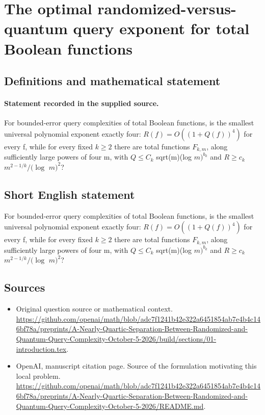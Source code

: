 \documentclass[11pt]{article}
\begin{document}
\section*{The optimal randomized-versus-quantum query exponent for total Boolean functions}\label{30007249}
\subsection{Definitions and mathematical statement}
\paragraph{Statement recorded in the supplied source.}
For bounded-error query complexities of total Boolean functions, is the smallest universal polynomial exponent exactly four: $R(f)=O((1+Q(f))^4)$ for every f, while for every fixed $k\geq 2$ there are total functions $F_{k,m}$, along sufficiently large powers of four m, with $Q\leq C_k$ sqrt(m)(log $m)^{b_k}$ and $R\geq c_k$ $m^{2-1/k}/(\log $ $m)^2$?
\subsection{Short English statement}
For bounded-error query complexities of total Boolean functions, is the smallest universal polynomial exponent exactly four: $R(f)=O((1+Q(f))^4)$ for every f, while for every fixed $k\geq 2$ there are total functions $F_{k,m}$, along sufficiently large powers of four m, with $Q\leq C_k$ sqrt(m)(log $m)^{b_k}$ and $R\geq c_k$ $m^{2-1/k}/(\log $ $m)^2$?
\subsection{Sources}
\begin{itemize}
\item[S1] Original question source or mathematical context.
\url{https://github.com/openai/math/blob/adc7f1241b42e322a6451854ab7e4b4c146bf78a/preprints/A-Nearly-Quartic-Separation-Between-Randomized-and-Quantum-Query-Complexity-October-5-2026/build/sections/01-introduction.tex}.
\item[S2] OpenAI, manuscript citation page. Source of the formulation motivating this local problem.
\url{https://github.com/openai/math/blob/adc7f1241b42e322a6451854ab7e4b4c146bf78a/preprints/A-Nearly-Quartic-Separation-Between-Randomized-and-Quantum-Query-Complexity-October-5-2026/README.md}.
\end{itemize}
\end{document}
